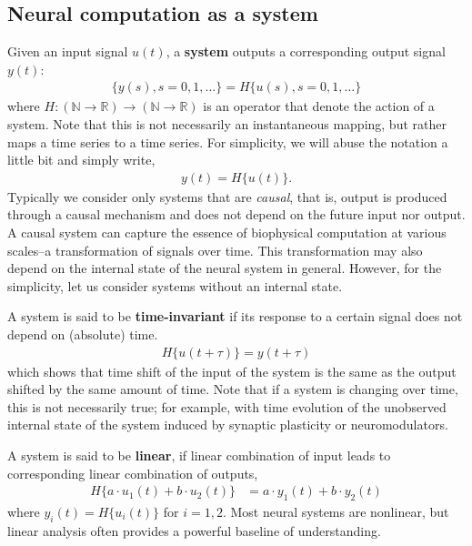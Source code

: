 \documentclass[a4paper,11pt]{exam}
\newcounter{ct}
\newcommand{\field}[1]{\ensuremath{\mathbb{#1}}}
\newcommand{\reals}{\field{R}}
\newcommand{\naturalNumbers}{\field{N}}
\begin{document}
\begin{questions}
\subsection{Neural computation as a system}
Given an input signal $u(t)$, a \textbf{system} outputs a corresponding output signal $y(t)$:
\begin{align}
    \{y(s), s = 0, 1, \ldots\} = H\{u(s), s = 0, 1, \ldots\}
\end{align}
where $H: (\naturalNumbers \to \reals) \to (\naturalNumbers \to \reals)$ is an operator that denote the action of a system.
Note that this is not necessarily an instantaneous mapping, but rather maps a time series to a time series.
For simplicity, we will abuse the notation a little bit and simply write,
\begin{align}
    y(t) = H\{u(t)\}.
\end{align}
Typically we consider only systems that are \emph{causal}, that is, output is produced through a causal mechanism and does not depend on the future input nor output.
A causal system can capture the essence of biophysical computation at various scales--a transformation of signals over time.
This transformation may also depend on the internal state of the neural system in general.
However, for the simplicity, let us consider systems without an internal state.

A system is said to be \textbf{time-invariant} if its response to a certain signal does not depend on (absolute) time.
\begin{align}\label{eq:lti:invariant}
    H\{u(t + \tau)\} = y(t + \tau)
\end{align}
which shows that time shift of the input of the system is the same as the output shifted by the same amount of time.
Note that if a system is changing over time, this is not necessarily true; for example, with time evolution of the unobserved internal state of the system induced by synaptic plasticity or neuromodulators.

A system is said to be \textbf{linear}, if linear combination of input leads to corresponding linear combination of outputs,
\begin{align}
    H\{a \cdot u_1(t) + b \cdot u_2(t)\} &= a \cdot y_1(t) + b \cdot y_2(t)
\end{align}
where $y_i(t) = H\{u_i(t)\}$ for $i = 1, 2$.
Most neural systems are nonlinear, but linear analysis often provides a powerful baseline of understanding.


\end{questions}
\end{document}
